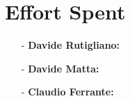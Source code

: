 \documentclass[a4paper]{article}
\begin{document}
\newpage
\section{Effort Spent}
    \begin{itemize}
        \item[-] \textbf{Davide Rutigliano:}
        
        \item[-] \textbf{Davide Matta:}
        
        \item[-] \textbf{Claudio Ferrante:}
    \end{itemize}
\end{document}
